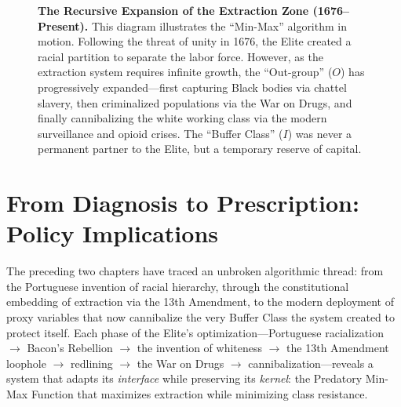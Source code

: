 \documentclass[12pt,openany]{book}
\begin{document}
\begin{figure}[h]
    \caption{\textbf{The Recursive Expansion of the Extraction Zone (1676--Present).} This diagram illustrates the ``Min-Max'' algorithm in motion. Following the threat of unity in 1676, the Elite created a racial partition to separate the labor force. However, as the extraction system requires infinite growth, the ``Out-group'' ($O$) has progressively expanded---first capturing Black bodies via chattel slavery, then criminalized populations via the War on Drugs, and finally cannibalizing the white working class via the modern surveillance and opioid crises. The ``Buffer Class'' ($I$) was never a permanent partner to the Elite, but a temporary reserve of capital.}
    \label{fig:extraction_zone}
\end{figure}

\chapter{From Diagnosis to Prescription: Policy Implications}

The preceding two chapters have traced an unbroken algorithmic thread: from the Portuguese invention of racial hierarchy, through the constitutional embedding of extraction via the 13th Amendment, to the modern deployment of proxy variables that now cannibalize the very Buffer Class the system created to protect itself. Each phase of the Elite's optimization---Portuguese racialization $\rightarrow$ Bacon's Rebellion $\rightarrow$ the invention of whiteness $\rightarrow$ the 13th Amendment loophole $\rightarrow$ redlining $\rightarrow$ the War on Drugs $\rightarrow$ cannibalization---reveals a system that adapts its \textit{interface} while preserving its \textit{kernel}: the Predatory Min-Max Function that maximizes extraction while minimizing class resistance.
\end{document}
